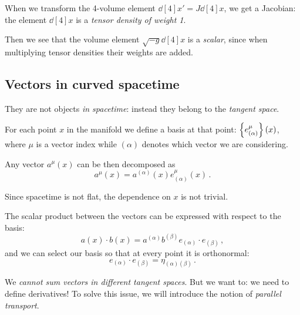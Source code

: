 \documentclass[main.tex]{subfiles}
\begin{document}
When we transform the 4-volume element \(\dd[4]{x'} = J \dd[4]{x} \), we get a Jacobian: the element \(\dd[4]{x} \) is a \emph{tensor density of weight 1}.

Then we see that the volume element \(\sqrt{-g} \dd[4]{x} \) is a \emph{scalar}, since when multiplying tensor densities their weights are added.

\subsection{Vectors in curved spacetime}

They are not objects \emph{in spacetime}: instead they belong to the \emph{tangent space}.

For each point \(x\) in the manifold we define a basis at that point: \(\qty{e^{\mu }_{(\alpha )}}(x)\), where \(\mu \) is a vector index while \((\alpha )\) denotes which vector we are considering.

Any vector \(a^{\mu }(x)\) can be then decomposed as  
%
\begin{equation}
  a^{\mu }(x) = a^{(\alpha) }(x) e^{\mu }_{(\alpha )}(x)
\,.
\end{equation}
%

Since spacetime is not flat, the dependence on \(x\) is not trivial.

The scalar product between the vectors can be expressed with respect to the basis: 
%
\begin{equation}
  a(x) \cdot b(x) = a^{(\alpha )} b^{(\beta )} e_{(\alpha )}\cdot e_{(\beta )}
\,,
\end{equation}
%
and we can select our basis so that at every point it is orthonormal: 
%
\begin{equation}
    e_{(\alpha )}\cdot e_{(\beta )} = \eta_{(\alpha ) (\beta )}
\,.
\end{equation}
%

We \emph{cannot sum vectors in different tangent spaces}.
But we want to: we need to define derivatives!
To solve this issue, we will introduce the notion of \emph{parallel transport}.
\end{document}
